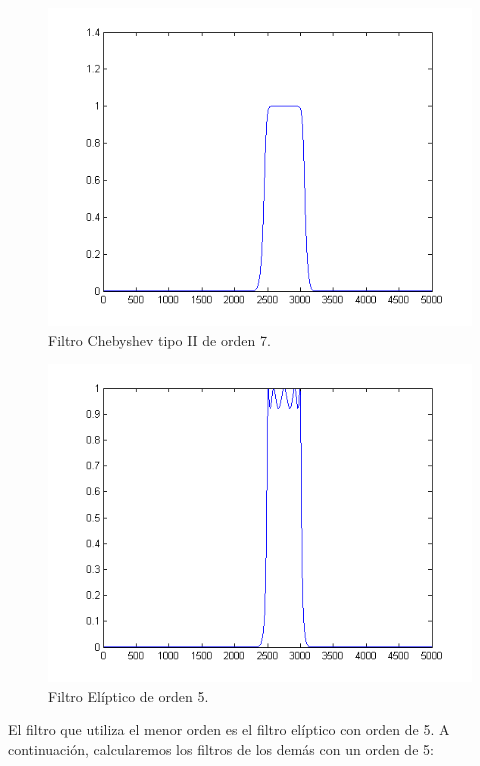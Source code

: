 \documentclass[10pt,a4paper,final]{article}
\begin{document}
\begin{figure}[h!]
\centering
  \caption{Filtro Chebyshev tipo II de orden 7.}
  \label{fig:res120}
  \includegraphics[scale=0.5]{fig14.png}
    
\end{figure}

\begin{figure}[h!]
\centering
  \caption{Filtro Elíptico de orden 5.}
  \label{fig:res120}
  \includegraphics[scale=0.5]{fig15.png}
    
\end{figure}

El filtro que utiliza el menor orden es el filtro elíptico con orden de 5. A continuación, calcularemos los filtros de los demás con un orden de 5:
\end{document}
